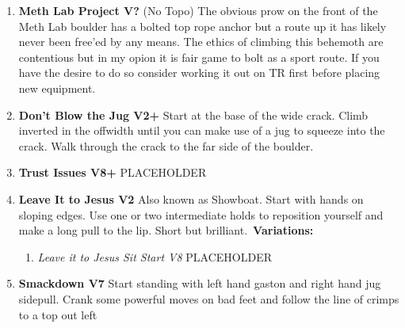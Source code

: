 \begin{multicols*}{2}
\label{pt:Octurnal}
				\begin{enumerate}[]
					\setcounter{enumi}{0}
					\item\label{rt:Meth Lab Project} \colorbox{black!20}{\textbf{Meth Lab Project V?  \warn \warn \warn } }
						\newline (No Topo) 
					\newline The obvious prow on the front of the Meth Lab boulder has a bolted top rope anchor but a route up it has likely never been free'ed by any means. The ethics of climbing this behemoth are contentious but in my opion it is fair game to bolt as a sport route. If you have the desire to do so consider working it out on TR first before placing new equipment.\
					\setcounter{enumi}{1}
					\item\label{rt:Don't Blow the Jug} \colorbox{green!20}{\textbf{Don't Blow the Jug V2+ \ding{72} \ding{72}  \warn } }
					\newline Start at the base of the wide crack. Climb inverted in the offwidth until you can make use of a jug to squeeze into the crack. Walk through the crack to the far side of the boulder.\
					\setcounter{enumi}{2}
					\item\label{rt:Trust Issues} \colorbox{Goldenrod!50}{\textbf{Trust Issues V8+  \warn \warn } }
					\newline PLACEHOLDER\
					\setcounter{enumi}{3}
					\item\label{rt:Leave It to Jesus} \colorbox{green!20}{\textbf{Leave It to Jesus V2   \ding{72}  } }
					\newline Also known as Showboat. Start with hands on sloping edges. Use one or two intermediate holds to reposition yourself and make a long pull to the lip. Short but brilliant.\
					\newline \textbf{Variations:}
					\begin{enumerate}
						\item\label{vr:Leave it to Jesus Sit Start} \colorbox{Goldenrod!50}{\emph{Leave it to Jesus Sit Start V8  }  }
						\newline PLACEHOLDER\
					\end{enumerate}
					\setcounter{enumi}{4}
					\item\label{rt:Smackdown} \colorbox{Goldenrod!50}{\textbf{Smackdown V7    } }
					\newline Start standing with left hand gaston and right hand jug sidepull. Crank some powerful moves on bad feet and follow the line of crimps to a top out left\

\end{enumerate}
\end{multicols*}
